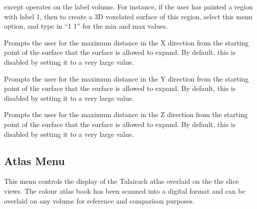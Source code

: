 \begin{description}
     except operates on
    the label volume.  For instance, if the user has painted a region
    with label 1, then to create a 3D voxelated surface of this region,
    select this menu option, and type in ``1 1'' for the min and max values.
\item[\menutwo{Create Surface}{X Dist}]  Prompts the user for the maximum
    distance in the X direction from the starting point of the surface
    that the surface is allowed to expand.  By default, this is disabled
    by setting it to a very large value.
\item[\menutwo{Create Surface}{Y Dist}]  Prompts the user for the maximum
    distance in the Y direction from the starting point of the surface
    that the surface is allowed to expand.  By default, this is disabled
    by setting it to a very large value.
\item[\menutwo{Create Surface}{Z Dist}]  Prompts the user for the maximum
    distance in the Z direction from the starting point of the surface
    that the surface is allowed to expand.  By default, this is disabled
    by setting it to a very large value.
\end{description}

\subsection{Atlas Menu}

This menu controls the display of the Talairach atlas overlaid on the
the slice views.  The colour atlas book has been scanned into a digital
format and can be overlaid on any volume for reference and comparison
purposes.

